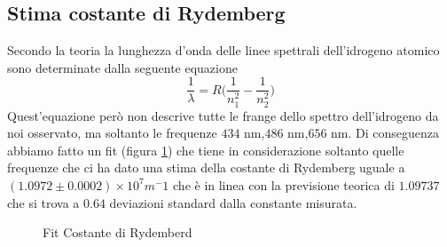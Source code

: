 \documentclass[10pt,a4paper]{article}
\begin{document}
	\subsection*{Stima costante di Rydemberg}
		Secondo la teoria la lunghezza d'onda delle linee spettrali dell'idrogeno atomico sono determinate dalla seguente equazione
		\begin{equation}
			\frac1\lambda=R\bigg(\frac1{n_1^2}-\frac1{n_2^2}\bigg)
			\label{eq:ryd}
		\end{equation}
		Quest'equazione però non descrive tutte le frange dello spettro dell'idrogeno da noi osservato, ma soltanto le frequenze $434$ nm,$486$ nm,$656$ nm.\newline
		Di conseguenza abbiamo fatto un fit (figura \ref{fig:ryd}) che tiene in considerazione soltanto quelle frequenze che ci ha dato una stima della costante di Rydemberg uguale a  $(1.0972 \pm 0.0002) \times 10^{7}m^-1$ che è in linea con la previsione teorica di $1.09737$ che si trova a $0.64$ deviazioni standard dalla constante misurata.\newline
		\begin{figure}[H]
	    	\centering
		    \quad
		    \caption{Fit Costante di Rydemberd}
		    \label{fig:ryd}
	    \end{figure}
\end{document}
